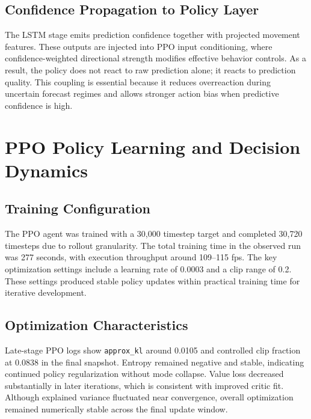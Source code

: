 \subsection{Confidence Propagation to Policy Layer}

The LSTM stage emits prediction confidence together with projected movement features. These outputs are injected into PPO input conditioning, where confidence-weighted directional strength modifies effective behavior controls. As a result, the policy does not react to raw prediction alone; it reacts to prediction quality. This coupling is essential because it reduces overreaction during uncertain forecast regimes and allows stronger action bias when predictive confidence is high.

\section{PPO Policy Learning and Decision Dynamics}

\subsection{Training Configuration}

The PPO agent was trained with a 30,000 timestep target and completed 30,720 timesteps due to rollout granularity. The total training time in the observed run was 277 seconds, with execution throughput around 109--115 fps. The key optimization settings include a learning rate of 0.0003 and a clip range of 0.2. These settings produced stable policy updates within practical training time for iterative development.

\subsection{Optimization Characteristics}

Late-stage PPO logs show \texttt{approx\_kl} around 0.0105 and controlled clip fraction at 0.0838 in the final snapshot. Entropy remained negative and stable, indicating continued policy regularization without mode collapse. Value loss decreased substantially in later iterations, which is consistent with improved critic fit. Although explained variance fluctuated near convergence, overall optimization remained numerically stable across the final update window.

